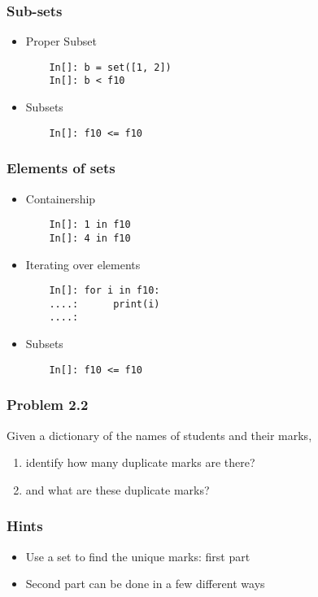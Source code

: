 \documentclass[14pt,compress]{beamer}
\begin{document}
\begin{frame}[fragile]
  \frametitle{Sub-sets}
  \begin{itemize}
  \item Proper Subset
    \begin{lstlisting}
    In[]: b = set([1, 2])
    In[]: b < f10
    \end{lstlisting}
  \item Subsets
    \begin{lstlisting}
    In[]: f10 <= f10
    \end{lstlisting}
  \end{itemize}
\end{frame}

\begin{frame}[fragile]
  \frametitle{Elements of sets}
  \begin{itemize}
  \item Containership
    \begin{lstlisting}
    In[]: 1 in f10
    In[]: 4 in f10
    \end{lstlisting}
  \item Iterating over elements
    \begin{lstlisting}
    In[]: for i in f10:
    ....:      print(i)
    ....:
    \end{lstlisting}
  \item Subsets
    \begin{lstlisting}
    In[]: f10 <= f10
    \end{lstlisting}
  \end{itemize}
\end{frame}

\begin{frame}
  \frametitle{Problem 2.2}
  Given a dictionary of the names of students and their marks,

  \begin{enumerate}
  \item identify how many duplicate marks are there?
  \item and what are these duplicate marks?
  \end{enumerate}

\end{frame}

\begin{frame}
  \frametitle{Hints}
  \begin{itemize}
  \item Use a set to find the unique marks: first part
  \item Second part can be done in a few different ways
  \end{itemize}
\end{frame}
\end{document}
